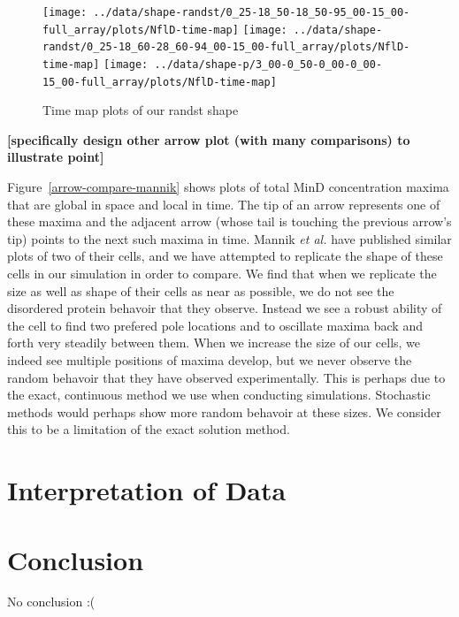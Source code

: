 \documentclass[letterpaper,twocolumn,amsmath,amssymb,pre]{revtex4-1}
\newcommand{\red}[1]{{\bf \color{red} #1}}
\newcommand{\fixme}[1]{\red{[#1]}}
\begin{document}
\begin{figure}
  \texttt{[image: ../data/shape-randst/0\_25-18\_50-18\_50-95\_00-15\_00-full\_array/plots/NflD-time-map]}
  \texttt{[image: ../data/shape-randst/0\_25-18\_60-28\_60-94\_00-15\_00-full\_array/plots/NflD-time-map]}
  \texttt{[image: ../data/shape-p/3\_00-0\_50-0\_00-0\_00-15\_00-full\_array/plots/NflD-time-map]}
  \caption{Time map plots of our randst shape}
  \label{time-maps-randst}
\end{figure}


\fixme{specifically design other arrow plot (with many comparisons) to
  illustrate point}


Figure~\ref{arrow-compare-mannik} shows plots of total MinD
concentration maxima that are global in space and local in time.  The
tip of an arrow represents one of these maxima and the adjacent arrow
(whose tail is touching the previous arrow's tip) points to the next
such maxima in time.  Mannik \emph{et al.} have published similar
plots of two of their cells, and we have attempted to replicate the
shape of these cells in our simulation in order to compare.  We find
that when we replicate the size as well as shape of their cells as
near as possible, we do not see the disordered protein behavoir that
they observe.  Instead we see a robust ability of the cell to find two
prefered pole locations and to oscillate maxima back and forth very
steadily between them.  When we increase the size of our cells, we
indeed see multiple positions of maxima develop, but we never observe
the random behavoir that they have observed experimentally.  This is
perhaps due to the exact, continuous method we use when conducting
simulations.  Stochastic methods would perhaps show more random
behavoir at these sizes.  We consider this to be a limitation of the
exact solution method.



\section{Interpretation of Data}
\section{Conclusion}
No conclusion :(

\end{document}
